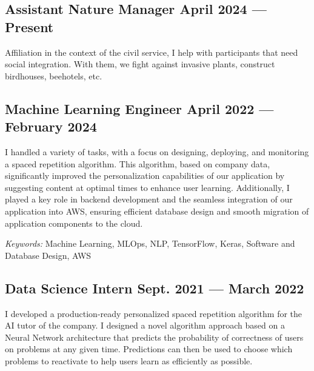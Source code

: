 \subsection{Assistant Nature Manager \hfill April 2024 --- Present}
\vspace{0.7\baselineskip}

Affiliation in the context of the civil service, I help with participants that need social integration. With them, we fight against invasive plants, construct birdhouses, beehotels, etc.

\subsection{Machine Learning Engineer \hfill April 2022 --- February 2024}
\vspace{0.7\baselineskip}

I handled a variety of tasks, with a focus on designing, deploying, and monitoring a spaced repetition algorithm. This algorithm, based on company data, significantly improved the personalization capabilities of our application by suggesting content at optimal times to enhance user learning. Additionally, I played a key role in backend development and the seamless integration of our application into AWS, ensuring efficient database design and smooth migration of application components to the cloud.

\textit{Keywords:} Machine Learning, MLOps, NLP, TensorFlow, Keras, Software and Database Design, AWS
\vspace{0.35\baselineskip}

\subsection{Data Science Intern \hfill Sept. 2021 --- March 2022}
\vspace{0.7\baselineskip}

I developed a production-ready personalized spaced repetition algorithm for the AI tutor of the company. I
designed a novel algorithm approach based on a Neural Network architecture that predicts the probability of
correctness of users on problems at any given time. Predictions can then be used to choose which problems to
reactivate to help users learn as efficiently as possible.\\

